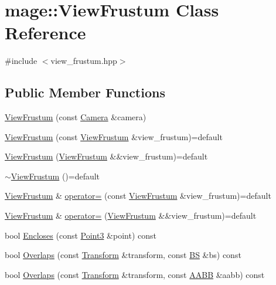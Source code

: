 \hypertarget{classmage_1_1_view_frustum}{}\section{mage\+:\+:View\+Frustum Class Reference}
\label{classmage_1_1_view_frustum}


{\ttfamily \#include $<$view\+\_\+frustum.\+hpp$>$}

\subsection*{Public Member Functions}
\begin{DoxyCompactItemize}
\item 
\hyperlink{classmage_1_1_view_frustum_ad1fd4a59f6cd0fd38289e66d4c6b5d51}{View\+Frustum} (const \hyperlink{classmage_1_1_camera}{Camera} \&camera)
\item 
\hyperlink{classmage_1_1_view_frustum_abbd4ec6c2766d3f630bce16cefa8bc4d}{View\+Frustum} (const \hyperlink{classmage_1_1_view_frustum}{View\+Frustum} \&view\+\_\+frustum)=default
\item 
\hyperlink{classmage_1_1_view_frustum_a3568cfa6a5d440455867eb11b88a5213}{View\+Frustum} (\hyperlink{classmage_1_1_view_frustum}{View\+Frustum} \&\&view\+\_\+frustum)=default
\item 
\hyperlink{classmage_1_1_view_frustum_aaa0e10f5401370909694e923c58323a9}{$\sim$\+View\+Frustum} ()=default
\item 
\hyperlink{classmage_1_1_view_frustum}{View\+Frustum} \& \hyperlink{classmage_1_1_view_frustum_add514821f691117c0ab139c13f86ef70}{operator=} (const \hyperlink{classmage_1_1_view_frustum}{View\+Frustum} \&view\+\_\+frustum)=default
\item 
\hyperlink{classmage_1_1_view_frustum}{View\+Frustum} \& \hyperlink{classmage_1_1_view_frustum_a0167f34c3ba505155ed6064c6d98a99c}{operator=} (\hyperlink{classmage_1_1_view_frustum}{View\+Frustum} \&\&view\+\_\+frustum)=default
\item 
bool \hyperlink{classmage_1_1_view_frustum_a290ee7b311278ed4701203859773aa42}{Encloses} (const \hyperlink{structmage_1_1_point3}{Point3} \&point) const
\item 
bool \hyperlink{classmage_1_1_view_frustum_ab45ef542b3bacf16390a8f223472bcd5}{Overlaps} (const \hyperlink{structmage_1_1_transform}{Transform} \&transform, const \hyperlink{structmage_1_1_b_s}{BS} \&bs) const
\item 
bool \hyperlink{classmage_1_1_view_frustum_a302c7b49592bc9e5a297270da0c8b6ec}{Overlaps} (const \hyperlink{structmage_1_1_transform}{Transform} \&transform, const \hyperlink{structmage_1_1_a_a_b_b}{A\+A\+BB} \&aabb) const
\end{DoxyCompactItemize}
